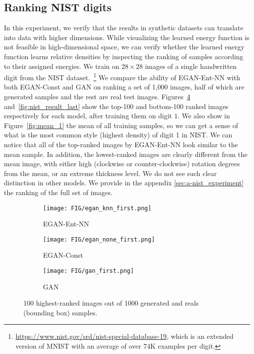\documentclass[a4paper]{article}
\begin{document}
\subsection{Ranking NIST digits}
In this experiment, we verify that the results in synthetic datasets can translate into data with higher dimensions. 
While visualizing the learned energy function is not feasible in high-dimensional space, we can verify whether the learned energy function learns relative densities by inspecting the ranking of samples according to their assigned energies. 
We train on $28\times 28$ images of a single handwritten digit from the NIST dataset.~\footnote{\url{https://www.nist.gov/srd/nist-special-database-19}, which is an extended version of MNIST with an average of over $74$K examples per digit.} 
We compare the ability of EGAN-Ent-NN with both EGAN-Const and GAN on ranking a set of 1,000 images, half of which are generated samples and the rest are real test images. 
Figures~\ref{fig:nist_result_first} and~\ref{fig:nist_result_last} show the top-100 and bottom-100 ranked images respectively for each model, after training them on digit $1$. 
We also show in Figure~\ref{fig:mean_1} the mean of all training samples, so we can get a sense of what is the most common style (highest density) of digit 1 in NIST. 
We can notice that all of the top-ranked images by EGAN-Ent-NN look similar to the mean sample. 
In addition, the lowest-ranked images are clearly different from the mean image, with either high (clockwise or counter-clockwise) rotation degrees from the mean, or an extreme thickness level. We do not see such clear distinction in other models. We provide in the appendix \ref{sec:a-nist_experiment} the ranking of the full set of images.

\begin{figure}[t!]
  \begin{subfigure}[b]{\linewidth}
    \texttt{[image: FIG/egan\_knn\_first.png]}
    \caption{EGAN-Ent-NN}
    \label{fig:nist_egan_knn_first}
  \end{subfigure}
  \hfill
  \begin{subfigure}[b]{\linewidth}
    \texttt{[image: FIG/egan\_none\_first.png]}
    \caption{EGAN-Const}
    \label{fig:nist_egan_none_first}
  \end{subfigure}
  \hfill
  \begin{subfigure}[b]{\linewidth}
    \texttt{[image: FIG/gan\_first.png]}
    \caption{GAN}
    \label{fig:nist_gan_first}
  \end{subfigure}
  \caption{100 highest-ranked images out of 1000 generated and reals (bounding box) samples. }
 \label{fig:nist_result_first}
\vspace{-0.6em}
\end{figure}
\end{document}
